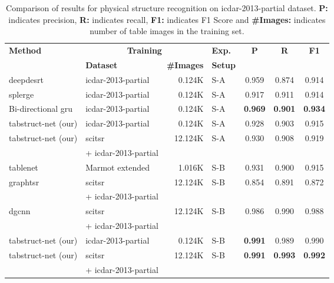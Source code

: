 \documentclass[runningheads]{llncs}
\begin{document}
\begin{table}
\begin{center}
\begin{tabular}{|l |l| r| l |c c c|} \hline
\textbf{Method} &\multicolumn{2}{|c|}{\textbf{Training}} &\textbf{Exp.} &\textbf{P} &\textbf{R} &\textbf{F1} \\ \cline{2-3}
  &\textbf{Dataset} &\textbf{\#Images} &\textbf{Setup} & & & \\ \hline
{\sc d}eep{\sc d}e{\sc srt}~\cite{schreiber2017deepdesrt} &{\sc icdar}-2013-partial  &0.124K &S-A &0.959 &0.874 &0.914 \\ 
{\sc splerge}~\cite{table_splitting} &{\sc icdar}-2013-partial  &0.124K &S-A &0.917 &0.911 &0.914 \\ 
Bi-directional {\sc gru}~\cite{Khan_2019} &{\sc icdar}-2013-partial &0.124K &S-A &\textbf{0.969} &\textbf{0.901} &\textbf{0.934} \\ 
 {\sc t}ab{\sc s}truct-{\sc n}et (our) &{\sc icdar}-2013-partial &0.124K &S-A &0.928  &0.903 &0.915 \\   
{\sc t}ab{\sc s}truct-{\sc n}et (our) &{\sc s}ci{\sc tsr} &12.124K &S-A &0.930  &0.908  &0.919 \\ 
 &+ {\sc icdar}-2013-partial & & & & & \\ \hline 
{\sc t}able{\sc n}et~\cite{paliwal2019tablenet} &Marmot extended &1.016K &S-B &0.931 &0.900 &0.915 \\
{\sc g}raph{\sc tsr}~\cite{chi2019complicated} &{\sc s}ci{\sc tsr} &12.124K &S-B &0.854  &0.891  &0.872 \\   
  &+ {\sc icdar}-2013-partial & & & & &  \\ 
{\sc dgcnn}~\cite{qasim2019rethinking} &{\sc s}ci{\sc tsr} &12.124K &S-B &0.986  &0.990  &0.988 \\
 &+ {\sc icdar}-2013-partial & & & & &  \\
 {\sc t}ab{\sc s}truct-{\sc n}et (our) &{\sc icdar}-2013-partial &0.124K &S-B &\textbf{0.991}  &0.989 &0.990 \\   
{\sc t}ab{\sc s}truct-{\sc n}et (our) &{\sc s}ci{\sc tsr} &12.124K &S-B &\textbf{0.991}  &\textbf{0.993}  &\textbf{0.992} \\   
 &+ {\sc icdar}-2013-partial & & & & &  \\ \hline
\end{tabular}
\end{center}
\caption{Comparison of results for physical structure recognition on {\sc icdar}-2013-partial dataset. \textbf{P:} indicates precision, \textbf{R:} indicates recall, \textbf{F1:} indicates F1 Score and \textbf{\#Images:} indicates number of table images in the training set. \label{table_physical_icdar_2013_partial}}
\end{table}
\end{document}
